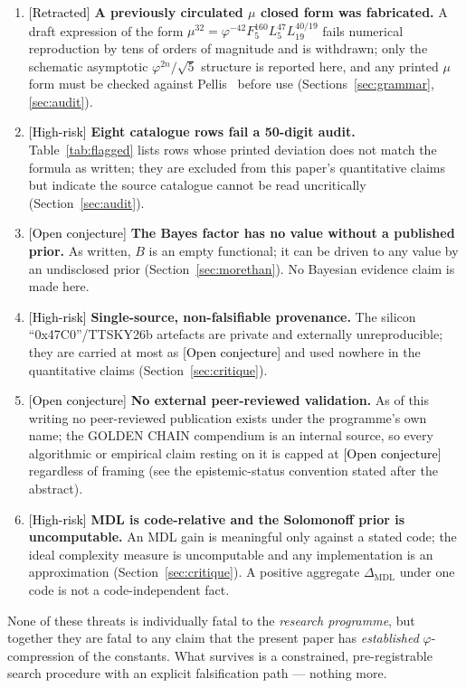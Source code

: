 \documentclass[11pt]{article}
\newcommand{\Conj}{\textcolor{black}{[Open conjecture]}}
\newcommand{\Risk}{\textcolor{black}{[High-risk]}}
\newcommand{\Retr}{\textcolor{black}{[Retracted]}}
\newcommand{\phigr}{\varphi}
\begin{document}
\begin{enumerate}[leftmargin=*]
\item \Retr{} \textbf{A previously circulated $\mu$ closed form was fabricated.} A draft expression of the form $\mu^{32} = \phigr^{-42} F_5^{160} L_5^{47} L_{19}^{40/19}$ fails numerical reproduction by tens of orders of magnitude and is withdrawn; only the schematic asymptotic $\phigr^{2n}/\sqrt 5$ structure is reported here, and any printed $\mu$ form must be checked against Pellis~\cite{pellis-mu} before use (Sections~\ref{sec:grammar}, \ref{sec:audit}).
\item \Risk{} \textbf{Eight catalogue rows fail a 50-digit audit.} Table~\ref{tab:flagged} lists rows whose printed deviation does not match the formula as written; they are excluded from this paper's quantitative claims but indicate the source catalogue cannot be read uncritically (Section~\ref{sec:audit}).
\item \Conj{} \textbf{The Bayes factor has no value without a published prior.} As written, $B$ is an empty functional; it can be driven to any value by an undisclosed prior (Section~\ref{sec:morethan}). No Bayesian evidence claim is made here.
\item \Risk{} \textbf{Single-source, non-falsifiable provenance.} The silicon ``0x47C0''/TTSKY26b artefacts are private and externally unreproducible; they are carried at most as \Conj{} and used nowhere in the quantitative claims (Section~\ref{sec:critique}).
\item \Conj{} \textbf{No external peer-reviewed validation.} As of this writing no peer-reviewed publication exists under the programme's own name; the GOLDEN CHAIN compendium is an internal source, so every algorithmic or empirical claim resting on it is capped at \Conj{} regardless of framing (see the epistemic-status convention stated after the abstract).
\item \Risk{} \textbf{MDL is code-relative and the Solomonoff prior is uncomputable.} An MDL gain is meaningful only against a stated code; the ideal complexity measure is uncomputable and any implementation is an approximation (Section~\ref{sec:critique}). A positive aggregate $\Delta_{\mathrm{MDL}}$ under one code is not a code-independent fact.
\end{enumerate}
None of these threats is individually fatal to the \emph{research programme}, but together they are fatal to any claim that the present paper has \emph{established} $\phigr$-compression of the constants. What survives is a constrained, pre-registrable search procedure with an explicit falsification path --- nothing more.
\end{document}
